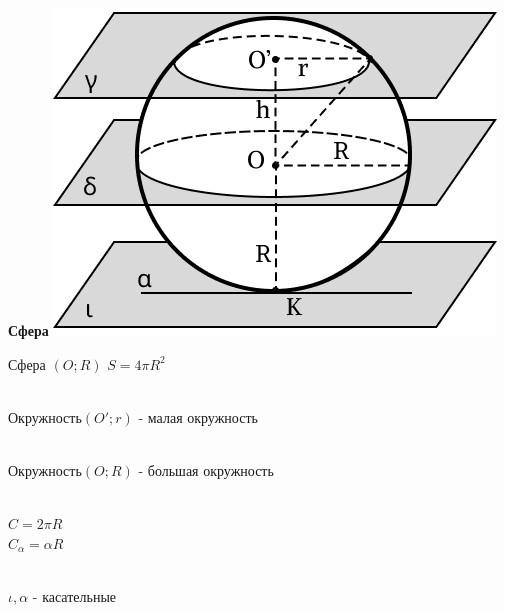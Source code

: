     \begin{minipage}[t]{0.25\textwidth}
        \begin{center}
            \textbf{Сфера}
            \includegraphics[width=1\linewidth]{images/img1}\\
        \end{center}
        \begin{flushleft}
            Сфера $(O;R)$
            $S = 4\pi R ^2$ \\ \

            Окружность$(O';r)$ - малая окружность\\ \

            Окружность$(O;R)$ - большая окружность\\ \

            $C=2\pi R$\\
            $C_\alpha = \alpha R$\\ \

            $\iota, \alpha$ - касательные

        \end{flushleft}
    \end{minipage}
